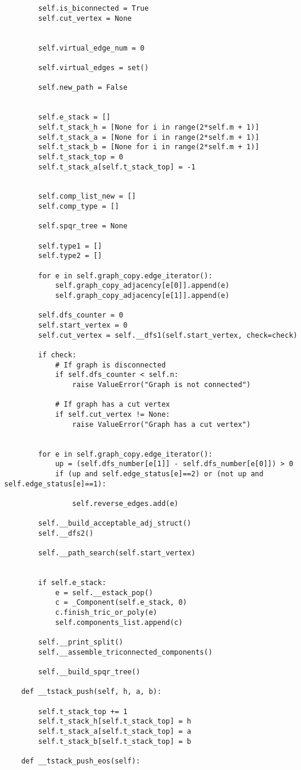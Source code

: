 \begin{verbatim}
		self.is_biconnected = True
		self.cut_vertex = None


		self.virtual_edge_num = 0

		self.virtual_edges = set()

		self.new_path = False


		self.e_stack = []
		self.t_stack_h = [None for i in range(2*self.m + 1)]
		self.t_stack_a = [None for i in range(2*self.m + 1)]
		self.t_stack_b = [None for i in range(2*self.m + 1)]
		self.t_stack_top = 0
		self.t_stack_a[self.t_stack_top] = -1


		self.comp_list_new = []
		self.comp_type = []

		self.spqr_tree = None

		self.type1 = []
		self.type2 = []

		for e in self.graph_copy.edge_iterator():
			self.graph_copy_adjacency[e[0]].append(e)
			self.graph_copy_adjacency[e[1]].append(e)

		self.dfs_counter = 0
		self.start_vertex = 0
		self.cut_vertex = self.__dfs1(self.start_vertex, check=check)

		if check:
			# If graph is disconnected
			if self.dfs_counter < self.n:
				raise ValueError("Graph is not connected")

			# If graph has a cut vertex
			if self.cut_vertex != None:
				raise ValueError("Graph has a cut vertex")


		for e in self.graph_copy.edge_iterator():
			up = (self.dfs_number[e[1]] - self.dfs_number[e[0]]) > 0
			if (up and self.edge_status[e]==2) or (not up and self.edge_status[e]==1):

				self.reverse_edges.add(e)

		self.__build_acceptable_adj_struct()
		self.__dfs2()

		self.__path_search(self.start_vertex)


		if self.e_stack:
			e = self.__estack_pop()
			c = _Component(self.e_stack, 0)
			c.finish_tric_or_poly(e)
			self.components_list.append(c)

		self.__print_split()
		self.__assemble_triconnected_components()

		self.__build_spqr_tree()

	def __tstack_push(self, h, a, b):

		self.t_stack_top += 1
		self.t_stack_h[self.t_stack_top] = h
		self.t_stack_a[self.t_stack_top] = a
		self.t_stack_b[self.t_stack_top] = b

	def __tstack_push_eos(self):


\end{verbatim}
